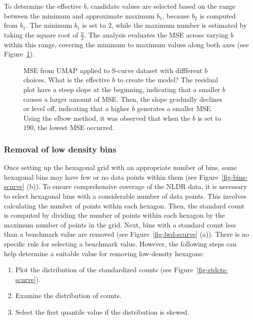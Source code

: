 \documentclass[
  12pt]{article}
\providecommand{\tightlist}{%
  \setlength{\itemsep}{0pt}\setlength{\parskip}{0pt}}\usepackage{longtable,booktabs,array}
\def\tightlist{}
\begin{document}
To determine the effective \(b\), candidate values are selected based on
the range between the minimum and approximate maximum \(b_1\), because
\(b_2\) is computed from \(b_1\). The minimum \(b_1\) is set to \(2\),
while the maximum number is estimated by taking the square root of
\(\frac{n}{2}\). The analysis evaluates the MSE across varying \(b\)
within this range, covering the minimum to maximum values along both
axes (see Figure~\ref{fig-mse-scurve-b}).

\begin{figure}[H]


\caption{\label{fig-mse-scurve-b}MSE from UMAP applied to S-curve
dataset with diffferent \(b\) choices. What is the effective \(b\) to
create the model? The residual plot have a steep slope at the beginning,
indicating that a smaller \(b\) causes a larger amount of MSE. Then, the
slope gradually declines or level off, indicating that a higher \(b\)
generates a smaller MSE. Using the elbow method, it was observed that
when the \(b\) is set to \(190\), the lowest MSE occurred.}

\end{figure}%

\subsubsection{Removal of low density
bins}\label{removal-of-low-density-bins}

Once setting up the hexagonal grid with an appropriate number of bins,
some hexagonal bins may have few or no data points within them (see
Figure~\ref{fig-bins-scurve} (b)). To ensure comprehensive coverage of
the NLDR data, it is necessary to select hexagonal bins with a
considerable number of data points. This involves calculating the number
of points within each hexagon. Then, the standard count is computed by
dividing the number of points within each hexagon by the maximum number
of points in the grid. Next, bins with a standard count less than a
benchmark value are removed (see Figure~\ref{fig-lwd-scurve} (a)). There
is no specific rule for selecting a benchmark value. However, the
following steps can help determine a suitable value for removing
low-density hexagons:

\begin{enumerate}
\def\labelenumi{\arabic{enumi}.}
\tightlist
\item
  Plot the distribution of the standardized counts (see
  Figure~\ref{fig-stdcts-scurve}).
\item
  Examine the distribution of counts.
\item
  Select the first quantile value if the distribution is skewed.
\end{enumerate}
\end{document}
